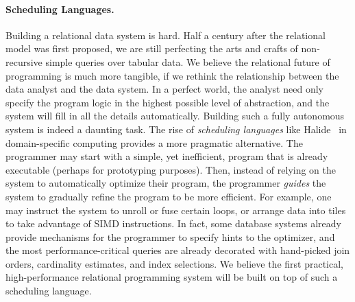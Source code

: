\paragraph*{Scheduling Languages.}
Building a relational data system is hard.
Half a century after the relational model was first proposed,
 we are still perfecting the arts and crafts of non-recursive
 simple queries over tabular data.
We believe the relational future of programming is much more tangible, 
 if we rethink the relationship between the data analyst and the data system.
In a perfect world, the analyst need only specify the program logic 
 in the highest possible level of abstraction, 
 and the system will fill in all the details automatically.
Building such a fully autonomous system is indeed a daunting task.
The rise of {\em scheduling languages} like Halide~\cite{DBLP:conf/pldi/Ragan-KelleyBAPDA13} 
 in domain-specific computing provides a more pragmatic alternative.
The programmer may start with a simple, yet inefficient, program that 
 is already executable (perhaps for prototyping purposes).
Then, instead of relying on the system to automatically optimize their program, 
 the programmer {\em guides} the system to gradually refine the program to be more efficient.
For example, one may instruct the system to unroll or fuse certain loops, 
 or arrange data into tiles to take advantage of SIMD instructions.
In fact, some database systems already provide mechanisms for 
 the programmer to specify hints to the optimizer,
 and the most performance-critical queries are already 
 decorated with hand-picked join orders, cardinality estimates, and index selections.
We believe the first practical, high-performance relational programming system 
 will be built on top of such a scheduling language.

